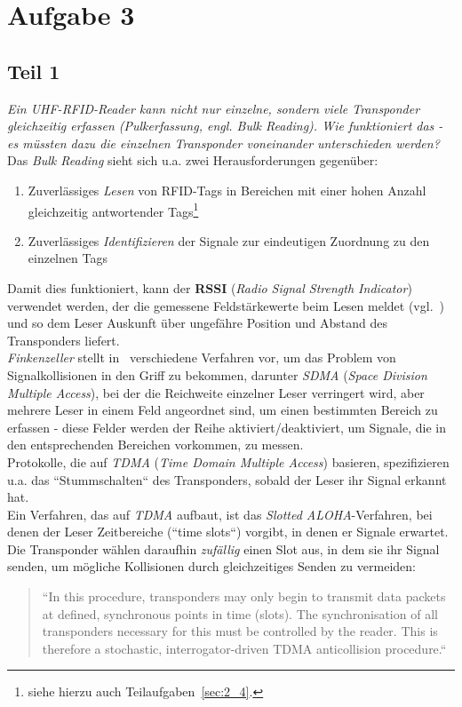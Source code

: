 \chapter{Aufgabe 3}

\section{Teil 1}

\textit{Ein UHF-RFID-Reader kann nicht nur einzelne, sondern viele Transponder gleichzeitig erfassen (Pulkerfassung, engl. Bulk Reading). Wie
funktioniert das - es müssten dazu die einzelnen Transponder voneinander unterschieden werden?}\\

\noindent
Das \textit{Bulk Reading} sieht sich u.a. zwei Herausforderungen gegenüber:

\begin{enumerate}
    \itemsep0.5em
    \item Zuverlässiges \textit{Lesen} von RFID-Tags in Bereichen mit einer hohen Anzahl gleichzeitig antwortender Tags\footnote{
    siehe hierzu auch Teilaufgaben~\ref{sec:2_4}.
    }
    \item Zuverlässiges \textit{Identifizieren} der Signale zur eindeutigen Zuordnung zu den einzelnen Tags
\end{enumerate}

\noindent
Damit dies funktioniert, kann der \textbf{RSSI} (\textit{Radio Signal Strength Indicator}) verwendet werden, der die gemessene Feldstärkewerte beim Lesen meldet (vgl.~\cite[136]{ES5}) und so dem Leser Auskunft über ungefähre Position und Abstand des Transponders liefert.\\
\textit{Finkenzeller} stellt in~\cite[194]{Fin10} verschiedene Verfahren vor, um das Problem von Signalkollisionen in den Griff zu bekommen, darunter \textit{SDMA} (\textit{Space Division Multiple Access}), bei der die Reichweite einzelner Leser verringert wird, aber mehrere Leser in einem Feld angeordnet sind, um einen bestimmten Bereich zu erfassen - diese Felder werden der Reihe aktiviert/deaktiviert, um Signale, die in den entsprechenden Bereichen vorkommen, zu messen.\\
Protokolle, die auf \textit{TDMA} (\textit{Time Domain Multiple Access}) basieren, spezifizieren u.a. das ``Stummschalten`` des Transponders, sobald der Leser ihr Signal erkannt hat.\\
Ein Verfahren, das auf \textit{TDMA} aufbaut, ist das \textit{Slotted ALOHA}-Verfahren, bei denen der Leser Zeitbereiche (``time slots``) vorgibt, in denen er Signale erwartet.
Die Transponder wählen daraufhin \textit{zufällig} einen Slot aus, in dem sie ihr Signal senden, um mögliche Kollisionen durch gleichzeitiges Senden zu vermeiden:

\blockquote[{\cite[201]{Fin10}}]{
    ``In this procedure, transponders may only begin to transmit data
    packets at defined, synchronous points in time (slots). The synchronisation of all transponders
    necessary for this must be controlled by the reader. This is therefore a stochastic, interrogator-driven
    TDMA anticollision procedure.``
}

